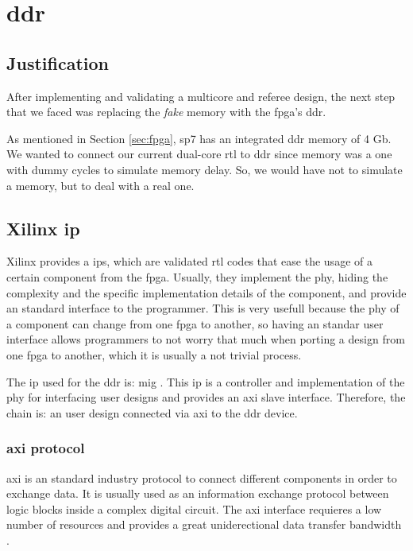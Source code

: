 \section{\acrshort{ddr}}
\subsection{Justification}
After implementing and validating a multicore and referee design, the next step that we faced was replacing the \textit{fake} memory with the \gls{fpga}'s \gls{ddr}.

As mentioned in Section \ref{sec:fpga}, \gls{sp7} has an integrated \gls{ddr} memory of 4 Gb.
We wanted to connect our current dual-core \gls{rtl} to \gls{ddr} since memory was a one with dummy cycles to simulate memory delay. 
So, we would have not to simulate a memory, but to deal with a real one.


\subsection{Xilinx \acrshort{ip}}
Xilinx provides a \glspl{ip}, which are validated \gls{rtl} codes that ease the usage of a certain component from the \gls{fpga}. 
Usually, they implement the \gls{phy}, hiding the complexity and the specific implementation details of the component, and provide an standard interface to the programmer. 
This is very usefull because the \gls{phy} of a component can change from one \gls{fpga} to another, so having an standar user interface allows programmers to not worry that much when porting a design from one \gls{fpga} to another, which it is usually a not trivial process.

The \gls{ip} used for the \gls{ddr} is: \gls{mig} \cite{mig}.
This \gls{ip} is a controller and implementation of the \gls{phy} for interfacing user designs and provides an \gls{axi} slave interface.
Therefore, the chain is: an user design connected via \gls{axi} to the \gls{ddr} device.

\subsubsection{\acrshort{axi} protocol}
\acrlong{axi} is an standard industry protocol to connect different components in order to exchange data.
It is usually used as an information exchange protocol between logic blocks inside a complex digital circuit.
The \gls{axi} interface requieres a low number of resources and provides a great uniderectional data transfer bandwidth \cite{axi}.

